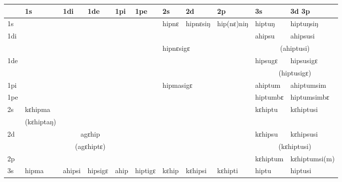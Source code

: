 \documentclass[oldfontcommands,twoside,a4paper,12pt]{memoir}
\newcommand{\ipab}[1]{{\scriptsize\phon #1}}
\begin{document}
\begin{landscape}


 
\begin{table}[t]

\begin{tabular}{l|l|l|l|l|l|l|l|l|l|l}  \toprule
&1s & 1di & 1de & 1pi & 1pe & 2s &2d & 2p & 3s & 3d  3p   \\ 
\midrule
1s  & \multicolumn{5}{c}{\cellcolor{lightgray}} & \ipab{hipnɛ} & \ipab{hipnɛsiŋ} & \ipab{hip(nɛ)niŋ} & \ipab{hiptuŋ} & \ipab{hiptuŋsiŋ} \\ 
\cline{7-11}1di  & \multicolumn{5}{c}{\cellcolor{lightgray}} & \multicolumn{2}{c}{} && \ipab{ahipsu} & \ipab{ahipsusi} \\ 
&\multicolumn{5}{c}{\cellcolor{lightgray}}  & \multicolumn{2}{l}{\ipab{hipnɛsigɛ}}   && \multicolumn{2}{c}{(\ipab{ahiptusi})} \\ 
1de	& \multicolumn{5}{c}{\cellcolor{lightgray}} & \multicolumn{2}{c}{} && \ipab{hipsugɛ} & \ipab{hipsusigɛ} \\ 
&\multicolumn{5}{c}{\cellcolor{lightgray}}  & \multicolumn{2}{c}{}   && \multicolumn{2}{c}{(\ipab{hiptusigɛ})} \\ 
\cline{7-11}1pi	& \multicolumn{5}{c}{\cellcolor{lightgray}} & \multicolumn{2}{l}{\ipab{hipmasigɛ}} &&  \ipab{ahiptum} & \ipab{ahiptumsim} \\ 
1pe	& \multicolumn{5}{c}{\cellcolor{lightgray}} & \multicolumn{2}{c}{} && \ipab{hiptumbɛ} & \ipab{hiptumsimbɛ} \\ 
\cline{10-11}2s & \ipab{kɛhipma}  &\multicolumn{4}{c}{}&\multicolumn{3}{c}{\cellcolor{lightgray}} & \ipab{kɛhiptu} & \ipab{kɛhiptusi} \\ 
& \ipab{(kɛhiptaŋ}) 	&\multicolumn{4}{c}{}&\multicolumn{3}{c}{\cellcolor{lightgray}}	&\\ 
\cline{2-2}2d &\multicolumn{5}{c}{\ipab{agɛhip}}  &\multicolumn{3}{c}{\cellcolor{lightgray}} & \ipab{kɛhipsu} & \ipab{kɛhipsusi} \\ 
& \multicolumn{5}{c}{\ipab{(agɛhiptɛ})} &\multicolumn{3}{c}{\cellcolor{lightgray}} & \multicolumn{2}{c}{(\ipab{kɛhiptusi})} 	\\ 
2p &\multicolumn{5}{c}{}  &\multicolumn{3}{c}{\cellcolor{lightgray}} & \ipab{kɛhiptum} & \ipab{kɛhiptumsi(m)} \\ 
\cline{2-6} \cline{10-11}3s & \ipab{hipma} & \ipab{ahipsi}   & \ipab{hipsigɛ}  & \ipab{ahip} & \ipab{hiptigɛ} & \ipab{kɛhip} & \ipab{kɛhipsi} & \ipab{kɛhipti} & \ipab{hiptu} & \ipab{hiptusi} \\ 

\end{tabular}
\end{table}
\end{landscape}
\end{document}
